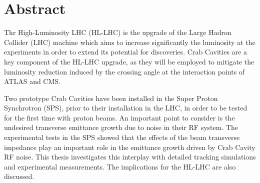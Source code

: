 \cleardoublepage
\chapter*{Abstract}


Thr High-Luminosity LHC (HL-LHC) is the upgrade of the Large Hadron Collider (LHC)  machine which aims to increase significantly the luminosity at the experiments in order to extend its potential for discoveries. Crab Cavities are a key component of the HL-LHC upgrade, as they will be employed to mitigate the luminosity reduction induced by the crossing angle at the interaction points of ATLAS and CMS. 


Two prototype Crab Cavities have been installed in the Super Proton Synchrotron (SPS), prior to their installation in the LHC, in order to be tested for the first time with proton beams. An important point to consider is the undesired transverse emittance growth due to noise in their RF system. The experimental tests in the SPS showed that the effects of the beam transverse impedance play an important role in the emittance growth driven by Crab Cavity RF noise. This thesis investigates this interplay with detailed tracking simulations and experimental measurements. The implications for the HL-LHC are also discussed.





